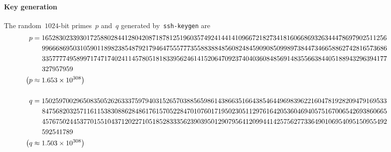 \documentclass{article}
\begin{document}
\paragraph{Key generation} The random~$1024$-bit primes~$p$ and~$q$ generated by~\texttt{ssh-keygen} are
\begin{align*}
\hspace*{-1cm} p &= 1652830233930172588028441280420871878125196035749241441410966721827341816066869326344478697902511256  \\
\hspace*{-1cm} & \hspace{0.48cm} 9966686950310590118982385487921794647555777355883884856082484590908509989738447346658862742816573686 \\
\hspace*{-1cm} & \hspace{0.48cm} 3357777495899717471740241145780518183395624614152064709237404036084856914835566384405188943296394177 \\
\hspace*{-1cm} & \hspace{0.48cm} 327957959 \\
\hspace*{-1cm} \big(p &\approx 1.653 \times 10^{308}\big) \\[15pt]
\hspace*{-1cm} q &= 1502597002965083505262633375979403152657038856598614386635166438546449698396221604781928209479169533 \\
\hspace*{-1cm} & \hspace{0.48cm} 8475682032571161153830886284861761570522847010760171950230511297616420536046940575167006542693860665 \\
\hspace*{-1cm} & \hspace{0.48cm} 4576750244537701551043712022710518528333562390395012907956412099441425756277336490106954095150955492 \\
\hspace*{-1cm} & \hspace{0.48cm} 592541789 \\
\hspace*{-1cm} \big(q &\approx 1.503 \times 10^{308}\big)
\end{align*}
\end{document}
